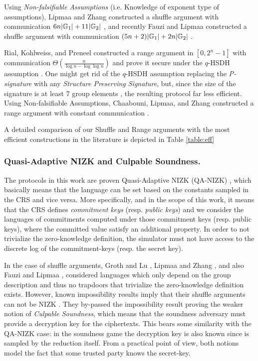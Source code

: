 Using \emph{Non-falsifiable Assumptions} (i.e. Knowledge of exponent type of assumptions), Lipmaa and Zhang constructed a shuffle argument with communication $6n|\mathbb{G}_1|+11|\mathbb{G}_2|$ \cite{SCN:LipZha12}, and recently Fauzi and Lipmaa constructed a shuffle argument with communication $(5n+2)|\mathbb{G}_1|+2n|\mathbb{G}_2|$ \cite{EPRINT:FauLip15}.

Rial, Kohlweiss, and Preneel constructed a range argument in $[0,2^n-1]$ with communication $\Theta(\frac{n}{\log n -\log\log n})$ and prove it secure under the $q$-HSDH assumption \cite{PAIRING:RiaKohPre09}. One might get rid of the $q$-HSDH assumption replacing the \emph{P-signature} with any \emph{Structure Preserving Signature}, but, since the size of the signature is at least 7 group elements \cite{C:KilPanWee15,C:LibPetYun15}, the resulting protocol far less efficient.
Using Non-falsifiable Assumptions, Chaabouni, Lipmaa, and Zhang constructed a range argument with constant communication \cite{FC:ChaLipZha12}. 

A detailed comparison of our Shuffle and Range arguments with the most efficient constructions in the literature is depicted in Table \ref{table:eff}



\subsubsection{Quasi-Adaptive NIZK and Culpable Soundness.} The protocols in this work are proven Quasi-Adaptive NIZK (QA-NIZK) \cite{AC:JutRoy13}, which basically means that the language can be set based on the constants sampled in the CRS and vice versa. More specifically, and in the scope of this work, it means that the CRS defines \emph{commitment keys} (resp. \emph{public keys}) and we consider the languages of commitments computed under those commitment keys (resp. public keys), where the committed value satisfy an additional property. In order to not trivialize the zero-knowledge definition, the simulator must not have access to the discrete log of the commitment-keys (resp. the secret key).

In the case of shuffle arguments, Groth and Lu \cite{AC:GroLu07}, Lipmaa and Zhang \cite{SCN:LipZha12}, and also Fauzi and Lipmaa \cite{EPRINT:FauLip15}, considered languages which only depend on the group description and thus no trapdoors that trivialize the zero-knowledge definition exists. However, known impossibility results imply that their shuffle arguments can not be NIZK \cite{TCC:AbeFeh07}. They by-passed the impossibility result proving the weaker notion of \emph{Culpable Soundness}, which means that the soundness adversary must provide a decryption key for the ciphertexts. This bears some similarity with the QA-NIZK case: in the soundness game the decryption key is also known since is sampled by the reduction itself. From a practical point of view, both notions model the fact that some trusted party knows the secret-key.

